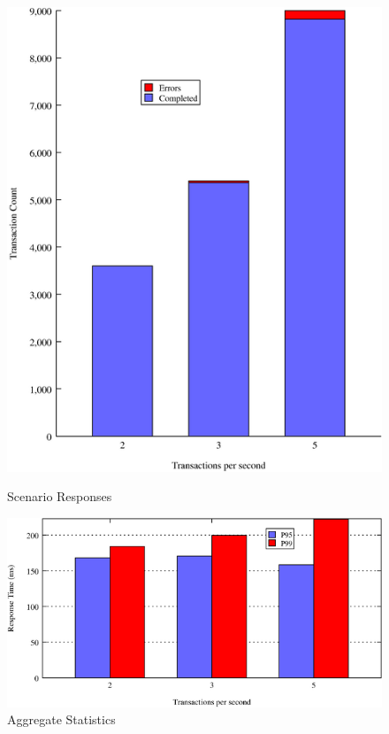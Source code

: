 \begin{figure}[!h]
    \includegraphics[width=\linewidth]{Figures/ScenarioResponses.png}
  \caption[Scenario Responses]{Scenario Responses}
  \label{fig:ScenarioResponses}
\endminipage\hfill
{}
    \includegraphics[width=\linewidth]{Figures/AggregateStats.png}
  \caption[Aggregate Statistics]{Aggregate Statistics}
  \label{fig:AggregateStats}
\endminipage\hfill
\end{figure}

